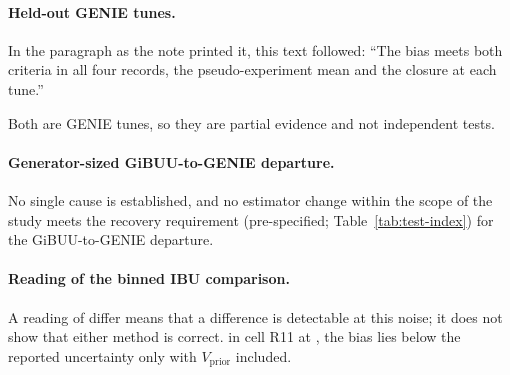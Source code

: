 \paragraph{Held-out GENIE tunes.} In the paragraph as the note printed it, this text followed: ``The bias meets both criteria in all four records, the pseudo-experiment mean and the closure at each tune.''\par Both are GENIE tunes, so they are partial evidence and not independent tests.

\paragraph{Generator-sized GiBUU-to-GENIE departure.} No single cause is established, and no estimator change within the scope of the study meets the recovery requirement (pre-specified; Table~\ref{tab:test-index}) for the GiBUU-to-GENIE departure.

\paragraph{Reading of the binned IBU comparison.} A reading of differ means that a difference is detectable at this noise; it does not show that either method is correct. in cell R11 at , the bias lies below the reported uncertainty only with $V_{\mathrm{prior}}$ included.


